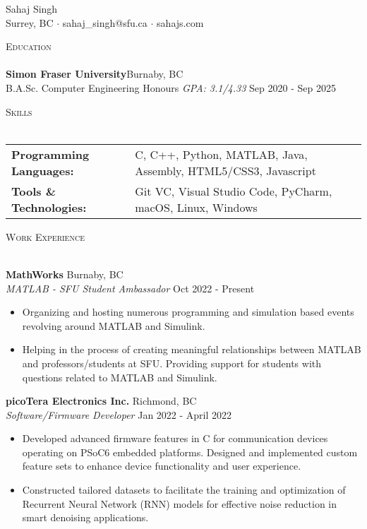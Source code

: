 \documentclass[a4paper]{article}
\newcommand{\lineunder} {
    \vspace*{-8pt} \\
    \hspace*{-18pt} \hrulefill \\
}
\newcommand{\header} [1] {
    {\hspace*{-18pt}\vspace*{6pt} \textsc{#1}}
    \vspace*{-6pt} \lineunder
}
\begin{document}
\vspace*{-40pt}

\vspace*{-10pt}
\begin{center}
	{\Huge {Sahaj Singh}}\\
    \vspace{1mm}
	Surrey, BC $\cdot$ sahaj\_singh@sfu.ca $\cdot$ sahajs.com\\
\end{center}

\header{Education}
\textbf{Simon Fraser University}\hfill Burnaby, BC\\
B.A.Sc. Computer Engineering Honours \textit{GPA: 3.1/4.33} \hfill Sep 2020 - Sep 2025\\
\vspace{1mm}

\header{Skills}
\begin{tabular}{ l l }
	\textbf{Programming Languages:} & C, C++, Python, MATLAB, Java, Assembly, HTML5/CSS3, Javascript \\
	\textbf{Tools \& Technologies:} & Git VC, Visual Studio Code, PyCharm, macOS, Linux, Windows         \\
\end{tabular}
\vspace{1mm}

\header{Work Experience}
\vspace{1mm}

\textbf{MathWorks} \hfill Burnaby, BC\\
\textit{MATLAB - SFU Student Ambassador} \hfill Oct 2022 - Present\\
\vspace{-3mm}
\begin{itemize} \itemsep -3pt
	\item Organizing and hosting numerous programming and simulation based events revolving around MATLAB and Simulink.
	\item Helping in the process of creating meaningful relationships between MATLAB and professors/students at SFU. Providing support for students with questions related to MATLAB and Simulink.
\end{itemize}
\vspace{-2mm}
\textbf{picoTera Electronics Inc.} \hfill Richmond, BC\\
\textit{Software/Firmware Developer} \hfill Jan 2022 - April 2022\\
\vspace{-3mm}
\begin{itemize} \itemsep -3pt
	\item Developed advanced firmware features in C for communication devices operating on PSoC6 embedded platforms. Designed and implemented custom feature sets to enhance device functionality and user experience.
	\item Constructed tailored datasets to facilitate the training and optimization of Recurrent Neural Network (RNN) models for effective noise reduction in smart denoising applications.
\end{itemize}
\end{document}
